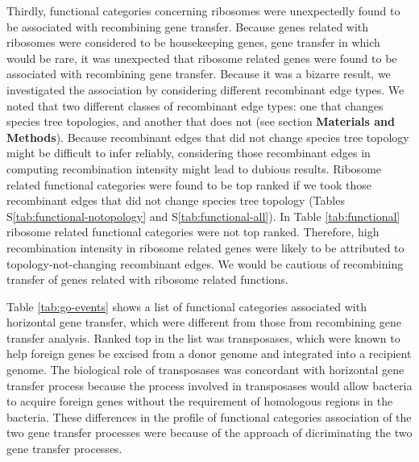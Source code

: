 \documentclass[10pt]{article}
\begin{document}
Thirdly, functional categories concerning ribosomes were unexpectedly
found to be associated with recombining gene transfer.  Because genes related
with ribosomes were considered to be housekeeping genes, gene transfer in which
would be rare, it was unexpected that ribosome related genes were found to be
associated with recombining gene transfer.  Because it was a bizarre result, we
investigated the association by considering different recombinant edge types. We
noted that two different classes of recombinant edge types: one that changes
species tree topologies, and another that does not
(see section \textbf{Materials and Methods}).
Because recombinant edges
that did not change species tree topology might be difficult to infer reliably,
considering those recombinant edges in computing recombination intensity might
lead to dubious results.  Ribosome related functional categories were found to
be top ranked if we took those recombinant edges that did not change species
tree topology (Tables S\ref{tab:functional-notopology} and
S\ref{tab:functional-all}).  In Table \ref{tab:functional} ribosome related
functional categories were not top ranked.  Therefore, high recombination
intensity in ribosome related genes were likely to be attributed to
topology-not-changing recombinant edges. We would be cautious of recombining
transfer of genes related with ribosome related functions.

Table \ref{tab:go-events} shows a list of functional categories associated with
horizontal gene transfer, which were different from those from recombining gene
transfer analysis.  Ranked top in the list was transposases, which were known to
help foreign genes be excised from a donor genome and integrated into a
recipient genome. The biological role of transposases was concordant with
horizontal gene transfer process because the process involved in transposases
would allow bacteria to acquire foreign genes without the requirement of
homologous regions in the bacteria.  
These differences in the profile of functional categories association of the two
gene transfer processes were because of the approach of dicriminating the two
gene transfer processes.

\end{document}
